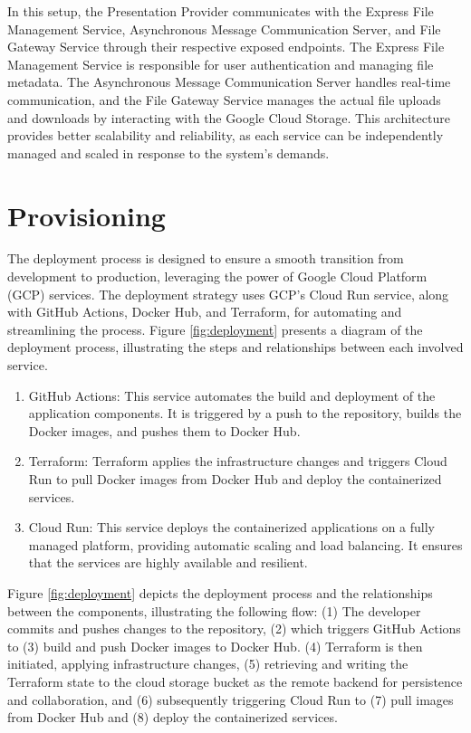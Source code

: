 \documentclass[a4paper,fleqn]{cas-dc}
\begin{document}
In this setup, the Presentation Provider communicates with the Express File Management Service, Asynchronous Message Communication Server, and File Gateway Service through their respective exposed endpoints. The Express File Management Service is responsible for user authentication and managing file metadata. The Asynchronous Message Communication Server handles real-time communication, and the File Gateway Service manages the actual file uploads and downloads by interacting with the Google Cloud Storage. This architecture provides better scalability and reliability, as each service can be independently managed and scaled in response to the system's demands.

\section{Provisioning} \label{sec:deployment}

The deployment process is designed to ensure a smooth transition from development to production, leveraging the power of Google Cloud Platform (GCP) services. The deployment strategy uses GCP's Cloud Run service, along with GitHub Actions, Docker Hub, and Terraform, for automating and streamlining the process. Figure \ref{fig:deployment} presents a diagram of the deployment process, illustrating the steps and relationships between each involved service.

\begin{enumerate}
\item GitHub Actions: This service automates the build and deployment of the application components. It is triggered by a push to the repository, builds the Docker images, and pushes them to Docker Hub.
\item Terraform: Terraform applies the infrastructure changes and triggers Cloud Run to pull Docker images from Docker Hub and deploy the containerized services.
\item Cloud Run: This service deploys the containerized applications on a fully managed platform, providing automatic scaling and load balancing. It ensures that the services are highly available and resilient.
\end{enumerate}

Figure \ref{fig:deployment} depicts the deployment process and the relationships between the components, illustrating the following flow: (1) The developer commits and pushes changes to the repository, (2) which triggers GitHub Actions to (3) build and push Docker images to Docker Hub. (4) Terraform is then initiated, applying infrastructure changes, (5) retrieving and writing the Terraform state to the cloud storage bucket as the remote backend for persistence and collaboration, and (6) subsequently triggering Cloud Run to (7) pull images from Docker Hub and (8) deploy the containerized services.
\end{document}
